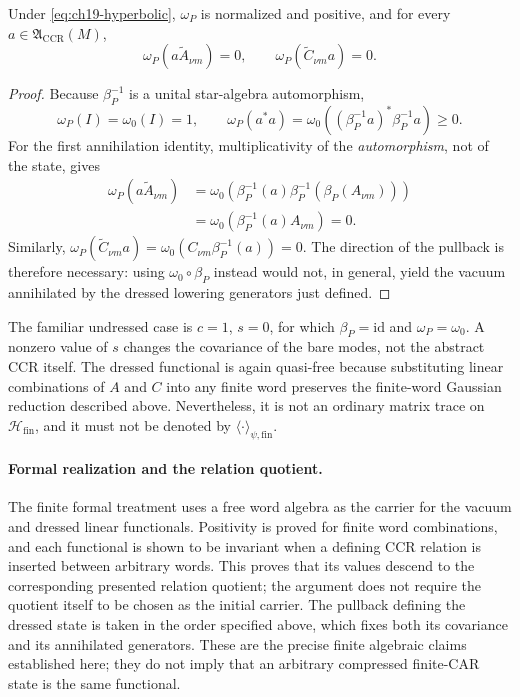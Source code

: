 \begin{proposition}
\label{prop:ch19-dressed-positive}
Under \eqref{eq:ch19-hyperbolic}, $\omega_P$ is normalized and
positive, and for every $a\in\mathfrak A_{\mathrm{CCR}}(M)$,
\begin{equation}
 \omega_P(a\widetilde A_{\nu m})=0,
 \qquad
 \omega_P(\widetilde C_{\nu m}a)=0.
 \label{eq:ch19-dressed-annihilation}
\end{equation}
\end{proposition}
\begin{proof}
Because $\beta_P^{-1}$ is a unital star-algebra automorphism,
\[
 \omega_P(I)=\omega_0(I)=1,\qquad
 \omega_P(a^*a)
 =\omega_0\!\left((\beta_P^{-1}a)^*\beta_P^{-1}a\right)\geq0.
\]
For the first annihilation identity, multiplicativity of the
\emph{automorphism}, not of the state, gives
\begin{align*}
 \omega_P(a\widetilde A_{\nu m})
 &=\omega_0\!\left(\beta_P^{-1}(a)
                      \beta_P^{-1}(\beta_P(A_{\nu m}))\right)\\
 &=\omega_0(\beta_P^{-1}(a)A_{\nu m})=0.
\end{align*}
Similarly,
$\omega_P(\widetilde C_{\nu m}a)
 =\omega_0(C_{\nu m}\beta_P^{-1}(a))=0$.
The direction of the pullback is therefore necessary:
using $\omega_0\circ\beta_P$ instead would not, in general, yield the
vacuum annihilated by the dressed lowering generators just defined.
\end{proof}

The familiar undressed case is $c=1$, $s=0$, for which
$\beta_P=\mathrm{id}$ and $\omega_P=\omega_0$.  A nonzero value of $s$
changes the covariance of the bare modes, not the abstract CCR
itself.  The dressed functional is again quasi-free because substituting
linear combinations of $A$ and $C$ into any finite word preserves the
finite-word Gaussian reduction described above.  Nevertheless, it is not
an ordinary matrix trace on $\mathcal H_{\mathrm{fin}}$, and it must not
be denoted by $\langle\cdot\rangle_{\psi,\mathrm{fin}}$.

\paragraph{Formal realization and the relation quotient.}
The finite formal treatment uses a free word algebra as the carrier for
the vacuum and dressed linear functionals. Positivity is proved for finite
word combinations, and each functional is shown to be invariant when a
defining CCR relation is inserted between arbitrary words. This proves
that its values descend to the corresponding presented relation quotient;
the argument does not require the quotient itself to be chosen as the
initial carrier. The pullback defining the dressed state is taken in the
order specified above, which fixes both its covariance and its annihilated
generators. These are the precise finite algebraic claims established
here; they do not imply that an arbitrary compressed finite-CAR state is
the same functional.

